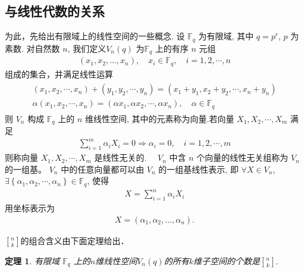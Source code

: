 \documentclass[a4paper,12pt]{ctexart}
\newtheorem{theo}{定理}[section]
\begin{document}
\subsection{与线性代数的关系}
为此，先给出有限域上的线性空间的一些概念. 设 $\mathbb{F}_q$ 为有限域, 其中 $q=p^{r}$, $p$ 为素数. 对自然数 $n$, 我们定义$V_{n}(q)$ 为$\mathbb{F}_q$ 上的有序 $n$ 元组
\begin{align*}
	\left(x_{1}, x_{2}, \ldots, x_{n}\right), \quad x_{i} \in \mathbb{F}_q, \quad i=1,2, \cdots, n
\end{align*}
组成的集合，并满足线性运算
\begin{align*}
	\begin{array}{c}
		\left(x_{1}, x_{2}, \cdots, x_{n}\right)+\left(y_{1}, y_{2}, \cdots, y_{n}\right)=\left(x_{1}+y_{1}, x_{2}+y_{2}, \cdots, x_{n}+y_{n}\right) \\
		\alpha\left(x_{1}, x_{2}, \cdots, x_{n}\right)=\left(\alpha x_{1}, \alpha x_{2}, \cdots, \alpha x_{n}\right), \quad \alpha \in \mathbb{F}_q
	\end{array}
\end{align*}
则 $V_{n}$ 构成 $\mathbb{F}_q$ 上的 $n$ 维线性空间, 其中的元素称为向量.若向量 $X_{1}, X_{2}, \cdots, X_{m}$ 满足
\begin{align*}
	\sum_{i=1}^{m} \alpha_{i} X_{i}=0 \Rightarrow \alpha_{i}=0, \quad i=1,2, \cdots, m
\end{align*}
则称向量 $X_{1}, X_{2}, \cdots, X_{m}$ 是线性无关的. $\quad V_{n}$ 中含 $n$ 个向量的线性无关组称为 $V_{n}$ 的一组基。 $V_{n}$ 中的任意向量都可以由 $V_{n}$ 的一组基线性表示, 即 $\forall X \in V_{n}$, $\exists\left\{\alpha_{1}, \alpha_{2}, \cdots, \alpha_{n}\right\} \in \mathbb{F}_q$, 使得
\begin{align*}
	X=\sum_{i=1}^{n} \alpha_{i} X_{i}
\end{align*}
用坐标表示为
\begin{align*}
	X=\left(\alpha_{1}, \alpha_{2}, \ldots, \alpha_{n}\right) .
\end{align*}

${n\brack
k}$的组合含义由下面定理给出．
\begin{theo}
有限域 $\mathbb{F}_q$ 上的$n$维线性空间$V_n(q)$的所有$k$维子空间的个数是${n\brack k}.$
\end{theo}
\end{document}
